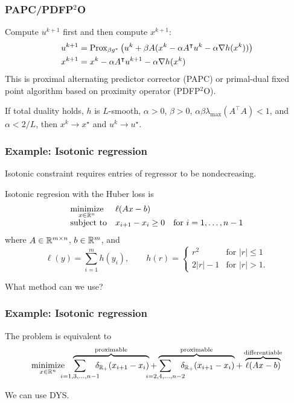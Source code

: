 \documentclass[10pt,mathserif]{beamer}
\begin{document}
\begin{frame}
\frametitle{PAPC/PDFP$^2$O}
Compute $ u ^{k+1}$ first and then compute $x^{k+1}$:
\begin{align*}
   u ^{k+1} & = \mathrm{Prox}_{\beta g^*}\left(
   u ^k+
  \beta A( x^k - \alpha A^\intercal u ^k-\alpha \nabla h(x^k))\right)\\
  x^{k+1} & = x^k - \alpha A^\intercal  u ^{k+1} -\alpha \nabla h(x^k)
\end{align*}
This is proximal alternating predictor corrector (PAPC)
or primal-dual fixed point algorithm based on proximity operator (PDFP$^2$O).
\vspace{0.2in}

If total duality holds, $h$ is $L$-smooth, $\alpha>0$, $\beta>0$, $\alpha \beta\lambda_{\mathrm{max}}(A^\intercal A)< 1$, and $\alpha<2/L$,
then $x^k\rightarrow x^\star$ and $ u ^k\rightarrow  u ^\star$.

\end{frame}




\begin{frame}[fragile]
\frametitle{Example: Isotonic regression}
Isotonic constraint requires entries of regressor to be nondecreasing.

\vspace{0.2in}

Isotonic regresion with the Huber loss is
\[
\begin{array}{ll}
\underset{x\in \mathbb{R}^n}{\mbox{minimize}} &
\displaystyle{\ell(Ax-b)}\\
\mbox{subject to} &x_{i+1}-x_i\ge 0\quad\text{for }i=1,\dots,n-1
\end{array}
\]
where $A\in \mathbb{R}^{m\times n}$, $b\in \mathbb{R}^m$, and
\[
\ell(y)=\sum^m_{i=1}h(y_i),\qquad
h(r)=\left\{
\begin{array}{ll}
r^2&\text{for } |r|\le 1\\
2|r|-1&\text{for } |r|>1.
\end{array}
\right.
\]

\vspace{0.2in}

What method can we use?
\end{frame}




\begin{frame}[fragile]
\frametitle{Example: Isotonic regression}
The problem is equivalent to
\[
\begin{array}{ll}
\underset{x\in \reals^n}{\mbox{minimize}} &
\displaystyle{
\overbrace{\!\!\!\!\!\!\!\!\!\sum_{i=1,3,\dots,n-1}\!\!\!\!\delta_{\reals_+}(x_{i+1}-x_i)}^{\text{proximable}}
+
\overbrace{\!\!\!\!\!\!\!\!\!\sum_{i=2,4,\dots,n-2}\!\!\!\!\delta_{\reals_+}(x_{i+1}-x_i)}^{\text{proximable}}
+
\overbrace{\ell(Ax-b)}^{\text{differentiable}}}
\end{array}
\]

\vspace{0.2in}

We can use DYS.
\end{frame}
\end{document}
